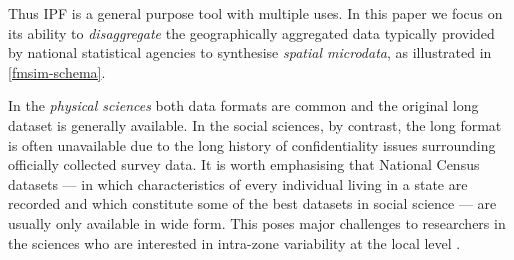 \documentclass[a4paper,10pt]{article}
\begin{document}
Thus IPF is a general purpose tool with multiple uses. In this paper we focus on its
ability to \emph{disaggregate} the geographically aggregated data typically
provided by national statistical agencies to synthesise \emph{spatial microdata},
as illustrated in \cref{fmsim-schema}.
% 
% 

In the \emph{physical sciences} both data formats are common and the
original long dataset is generally available. In the social sciences, by contrast, the long format is often unavailable
due to the long history of confidentiality
issues surrounding officially collected survey data.
It is worth emphasising that National Census datasets --- in which characteristics of 
every individual living in a state are recorded and which constitute some of the best datasets in social science ---
are usually only available
in wide form. This poses major challenges to researchers in the sciences who are
interested in intra-zone variability at the local level \citep{Whitworth2012,Lee2009}.
\end{document}
